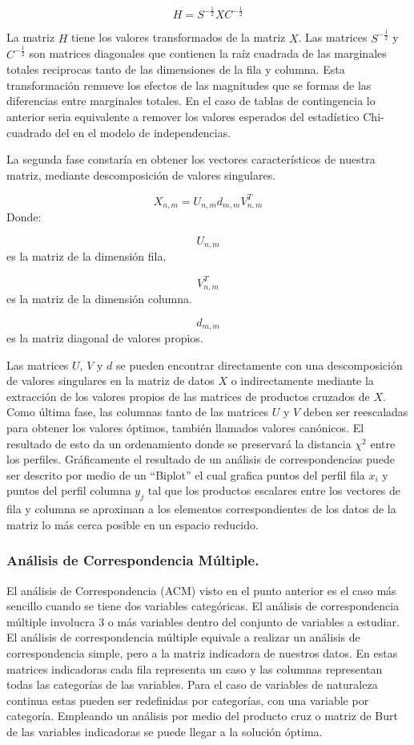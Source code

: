 \[ H=S^{-\frac{1}{2}}XC^{-\frac{1}{2}} \]

La matriz \(H\) tiene los valores transformados de la matriz \(X\). Las
matrices \(S^{-\frac{1}{2}}\) y \(C^{-\frac{1}{2}}\) son matrices
diagonales que contienen la raíz cuadrada de las marginales totales
reciprocas tanto de las dimensiones de la fila y columna. Esta
transformación remueve los efectos de las magnitudes que se formas de
las diferencias entre marginales totales. En el caso de tablas de
contingencia lo anterior seria equivalente a remover los valores
esperados del estadístico Chi-cuadrado del en el modelo de
independencias.

La segunda fase constaría en obtener los vectores característicos de
nuestra matriz, mediante descomposición de valores singulares.

\[ X_{n,m}= U_{n,m}d_{m,m}V^{T}_{n,m} \] Donde:

\[ U_{n,m}  \] es la matriz de la dimensión fila.

\[ V^{T}_{n,m}  \] es la matriz de la dimensión columna.

\[ d_{m,m} \] es la matriz diagonal de valores propios.

Las matrices \(U\), \(V\) y \(d\) se pueden encontrar directamente con
una descomposición de valores singulares en la matriz de datos \(X\) o
indirectamente mediante la extracción de los valores propios de las
matrices de productos cruzados de \(X\). Como última fase, las columnas
tanto de las matrices \(U\) y \(V\) deben ser reescaladas para obtener
los valores óptimos, también llamados valores canónicos. El resultado de
esto da un ordenamiento donde se preservará la distancia \(\chi ^{2}\)
entre los perfiles. Gráficamente el resultado de un análisis de
correspondencias puede ser descrito por medio de un ``Biplot'' el cual
grafica puntos del perfil fila \(x_i\) y puntos del perfil columna
\(y_j\) tal que los productos escalares entre los vectores de fila y
columna se aproximan a los elementos correspondientes de los datos de la
matriz lo más cerca posible en un espacio reducido.

\hypertarget{anuxe1lisis-de-correspondencia-muxfaltiple.}{%
\subsubsection{Análisis de Correspondencia
Múltiple.}\label{anuxe1lisis-de-correspondencia-muxfaltiple.}}

El análisis de Correspondencia (ACM) visto en el punto anterior es el
caso más sencillo cuando se tiene dos variables categóricas. El análisis
de correspondencia múltiple involucra 3 o más variables dentro del
conjunto de variables a estudiar. El análisis de correspondencia
múltiple equivale a realizar un análisis de correspondencia simple, pero
a la matriz indicadora de nuestros datos. En estas matrices indicadoras
cada fila representa un caso y las columnas representan todas las
categorías de las variables. Para el caso de variables de naturaleza
continua estas pueden ser redefinidas por categorías, con una variable
por categoría. Empleando un análisis por medio del producto cruz o
matriz de Burt de las variables indicadoras se puede llegar a la
solución óptima.

